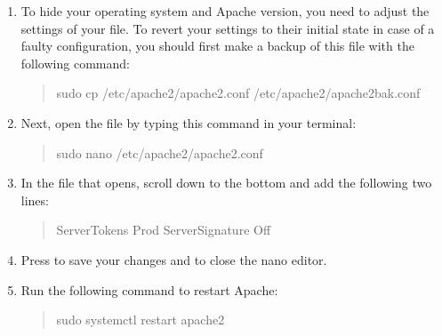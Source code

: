 \documentclass[letterpaper,10pt,english]{sphinxmanual}
\begin{document}
\begin{enumerate}
%
\item {} 
\sphinxAtStartPar
To hide your operating system and Apache version, you need to adjust the settings of your  file. To revert your settings to their initial state in case of a faulty configuration, you should first make a backup of this file with the following command:
\begin{quote}

\begin{sphinxVerbatim}[commandchars=\\\{\}]
\PYGZdl{} sudo cp /etc/apache2/apache2.conf /etc/apache2/apache2\PYGZus{}bak.conf
\end{sphinxVerbatim}
\end{quote}

\item {} 
\sphinxAtStartPar
Next, open the  file by typing this command in your terminal:
\begin{quote}

\begin{sphinxVerbatim}[commandchars=\\\{\}]
\PYGZdl{} sudo nano /etc/apache2/apache2.conf
\end{sphinxVerbatim}
\end{quote}

\item {} 
\sphinxAtStartPar
In the file that opens, scroll down to the bottom and add the following two lines:
\begin{quote}

\begin{sphinxVerbatim}[commandchars=\\\{\}]
ServerTokens Prod
ServerSignature Off
\end{sphinxVerbatim}
\end{quote}

\item {} 
\sphinxAtStartPar
Press  to save your changes and  to close the nano editor.

\item {} 
\sphinxAtStartPar
Run the following command to restart Apache:
\begin{quote}

\begin{sphinxVerbatim}[commandchars=\\\{\}]
\PYGZdl{} sudo systemctl restart apache2
\end{sphinxVerbatim}
\end{quote}


\end{enumerate}
\end{document}
